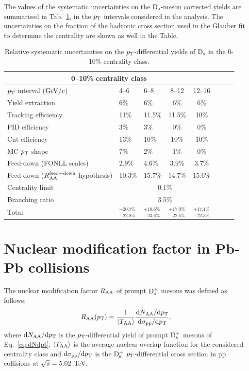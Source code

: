 The values of the systematic uncertainties on the ${\rm D_s}$-meson corrected yields
are summarised in Tab.~\ref{tab:sysunc_yieldtable}, in the $p_{\rm T}$ intervals considered in 
the analysis. The uncertainties on the fraction of the hadronic cross section used in the Glauber fit to determine
the centrality are shown as well in the Table.
\begin{table}[!h]
\centering
\begin{tabular}{|l|l|l|c|c|c|c|c|}
\hline
\multicolumn{5}{|c|}{0--10\% centrality class}       \\                                                                                                                                                                                                                                               \hline
$p_{\rm T}$ interval ($\mathrm{GeV}/c$)        &    4--6          & 6--8      &   8--12            & 12--16                  \\ 
\hline
Yield extraction & 6\% & 6\%& 6\%& 6\%\\
Tracking efficiency & 11\% &11.5\% &11.5\% & 10\% \\
PID efficiency & 3\%& 3\% & 0\%&  0\%\\
Cut efficiency & 13\%& 10\%& 10\%& 10\%\\
MC $p_{\rm T}$ shape & 7\%& 2\%& 1\%& 0\% \\
Feed-down (FONLL scales) & 2.9\% & 4.6\%& 3.9\%& 3.7\%\\
Feed-down ($R_{\rm AA}^{\rm feed-down}$ hypothesis) & 10.3\%& 15.7\%& 14.7\%& 15.6\% \\
\hline
Centrality limit & \multicolumn{4}{c|}{0.1\%}  \\
\hline
\hline
Branching ratio & \multicolumn{4}{c|}{3.5\%}  \\
\hline
\hline
Total & $^{+20.7\%}_{-22.8\%}$& $^{+18.6\%}_{-23.6\%}$ & $^{+17.9\%}_{-22.5\%}$ & $^{+17.1\%}_{-22.3\%}$  \\
\hline
\end{tabular}
\caption{Relative systematic uncertainties on the $p_{\rm T}$-differential yields of ${\rm D_s}$ in the 0-10\% centrality class.}
\label{tab:sysunc_yieldtable}
\end{table}

\section{Nuclear modification factor in Pb-Pb collisions}
\label{sec:RAA}
The nuclear modification factor $R_{\rm AA}$ of prompt ${\rm D_s^+}$ mesons was defined as follows:
\begin{equation}
\label{eq:RAADs}
R_{\rm AA} (p_{\rm T}) = \frac{1}{\langle T_{\rm AA} \rangle} \frac{{\rm d} N_{\rm AA}/{\rm d}p_{\rm T}}{{\rm d} \sigma_{\rm pp}/{\rm d} p_{\rm T}},
\end{equation}
where ${\rm d} N_{\rm AA}/{\rm d}p_{\rm T}$ is the $p_{\rm T}$-differential yield of prompt ${\rm D_s^+}$ mesons
of Eq.~\ref{eq:dNdpt}, $\langle T_{\rm AA} \rangle$ is the 
average nuclear overlap function for the considered centrality class and ${\rm d} \sigma_{\rm pp}/{\rm d} p_{\rm T}$ is 
the ${\rm D_s^+}$ $p_{\rm T}$-differential cross section in pp collisions at $\sqrt{s} = 5.02$ TeV.
